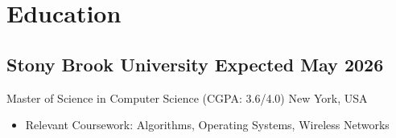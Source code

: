 \documentclass[a4,10pt]{article}
\begin{document}
\vspace{-0.1cm}
\section{Education}
\vspace{-0.1cm}
\subsection*{Stony Brook University \hfill Expected May 2026}{\normalsize \normalfont Master of Science in Computer Science (CGPA: 3.6/4.0) \hfill New York, USA}
\vspace{-0.2cm}
\begin{itemize}
    \item Relevant Coursework: Algorithms, Operating Systems, Wireless Networks
\end{itemize}
\vspace{-0.6cm}
\end{document}

